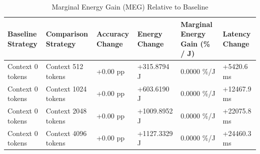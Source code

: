 \begin{table}
\caption{Marginal Energy Gain (MEG) Relative to Baseline}
\label{tab:marginal_energy_gain}
\begin{tabular}{llllll}
\toprule
Baseline Strategy & Comparison Strategy & Accuracy Change & Energy Change & Marginal Energy Gain (\% / J) & Latency Change \\
\midrule
Context 0 tokens & Context 512 tokens & +0.00 pp & +315.8794 J & 0.0000 \%/J & +5420.6 ms \\
Context 0 tokens & Context 1024 tokens & +0.00 pp & +603.6190 J & 0.0000 \%/J & +12467.9 ms \\
Context 0 tokens & Context 2048 tokens & +0.00 pp & +1009.8952 J & 0.0000 \%/J & +22075.8 ms \\
Context 0 tokens & Context 4096 tokens & +0.00 pp & +1127.3329 J & 0.0000 \%/J & +24460.3 ms \\
\bottomrule
\end{tabular}
\end{table}

